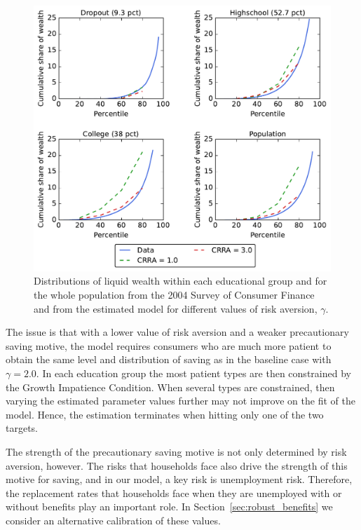 \documentclass[../HAFiscal]{subfiles}
\begin{document}
\begin{figure}[th]
	\begin{center}
		\includegraphics[width=.9\textwidth]{../Figures/LorenzPoints_robustness_CRRA.pdf}
		\caption{Distributions of liquid wealth within each educational group and for the whole population from the 2004 Survey of Consumer Finance and from the estimated model for different values of risk aversion, $\gamma$.}
		\label{fig:LorenzPts_robustness_CRRA}
	\end{center}
\end{figure}

The issue is that with a lower value of risk aversion and a weaker precautionary saving motive, the model requires consumers who are much more patient to obtain the same level and distribution of saving as in the baseline case with $\gamma=2.0$. In each education group the most patient types are then constrained by the Growth Impatience Condition. When several types are constrained, then varying the estimated parameter values further may not improve on the fit of the model. Hence, the estimation terminates when hitting only one of the two targets. 

The strength of the precautionary saving motive is not only determined by risk aversion, however. The risks that households face also drive the strength of this motive for saving, and in our model, a key risk is unemployment risk. Therefore, the replacement rates that households face when they are unemployed with or without benefits play an important role. In Section~\ref{sec:robust_benefits} we consider an alternative calibration of these values. 
\end{document}
